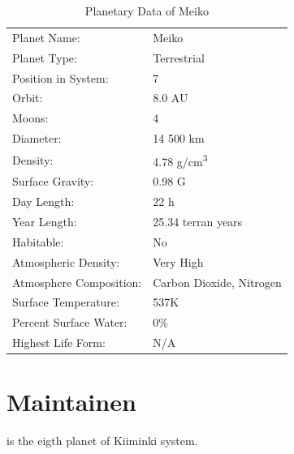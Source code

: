 \documentclass{tufte-book}
\begin{document}
\bigskip
\begin{table}
\begin{minipage}{\textwidth}
\begin{center}
\begin{tabular}{ll}
\toprule
Planet Name: & Meiko \\
Planet Type: & Terrestrial \\
Position in System: & 7 \\
Orbit: & 8.0 AU \\
Moons: & 4 \\
Diameter: & 14 500 km \\
Density: & 4.78 g/cm\textsuperscript{3} \\
Surface Gravity: & 0.98 G \\
Day Length: & 22 h \\
Year Length: & 25.34 terran years \\
Habitable: & No \\
\quad Atmospheric Density: & Very High \\
\quad Atmosphere Composition: & Carbon Dioxide, Nitrogen \\
\quad Surface Temperature: & 537K \\
\quad Percent Surface Water: & 0\% \\
\quad Highest Life Form: & N/A \\

\bottomrule
\end{tabular}
\end{center}
\end{minipage}
\caption{Planetary Data of Meiko}
\end{table}

\section{Maintainen}

 is the eigth planet of Kiiminki system.
\end{document}

